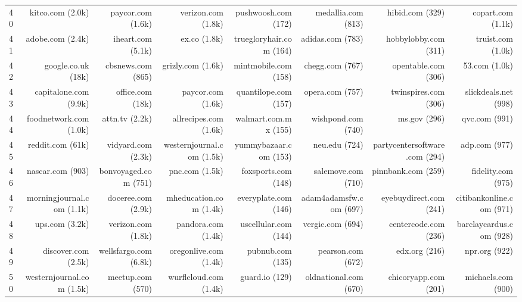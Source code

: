 \begin{table}[htbp]
\begin{adjustbox}{max width=\textwidth}
\begin{tabular}{lrrrrrrr}
40 & kitco.com (2.0k) & paycor.com (1.6k) & verizon.com (1.8k) & pushwoosh.com (172) & medallia.com (813) & hibid.com (329) & copart.com (1.1k) \\
41 & adobe.com (2.4k) & iheart.com (5.1k) & ex.co (1.8k) & truegloryhair.com (164) & adidas.com (783) & hobbylobby.com (311) & truist.com (1.0k) \\
42 & google.co.uk (18k) & cbsnews.com (865) & grizly.com (1.6k) & mintmobile.com (158) & chegg.com (767) & opentable.com (306) & 53.com (1.0k) \\
43 & capitalone.com (9.9k) & office.com (18k) & paycor.com (1.6k) & quantilope.com (157) & opera.com (757) & twinspires.com (306) & slickdeals.net (998) \\
44 & foodnetwork.com (1.0k) & attn.tv (2.2k) & allrecipes.com (1.6k) & walmart.com.mx (155) & wishpond.com (740) & ms.gov (296) & qvc.com (991) \\
45 & reddit.com (61k) & vidyard.com (2.3k) & westernjournal.com (1.5k) & yummybazaar.com (153) & neu.edu (724) & partycentersoftware.com (294) & adp.com (977) \\
46 & nascar.com (903) & bonvoyaged.com (751) & pnc.com (1.5k) & foxsports.com (148) & salemove.com (710) & pinnbank.com (259) & fidelity.com (975) \\
47 & morningjournal.com (1.1k) & doceree.com (2.9k) & mheducation.com (1.4k) & everyplate.com (146) & adam4adamsfw.com (697) & eyebuydirect.com (241) & citibankonline.com (971) \\
48 & ups.com (3.2k) & verizon.com (1.8k) & pandora.com (1.4k) & uscellular.com (144) & vergic.com (694) & centercode.com (236) & barclaycardus.com (928) \\
49 & discover.com (2.5k) & wellsfargo.com (6.8k) & oregonlive.com (1.4k) & pubnub.com (135) & pearson.com (672) & edx.org (216) & npr.org (922) \\
50 & westernjournal.com (1.5k) & meetup.com (570) & wurflcloud.com (1.4k) & guard.io (129) & oldnational.com (670) & chicoryapp.com (201) & michaels.com (900) \\
\bottomrule
\end{tabular}
\end{adjustbox}
\end{table}
